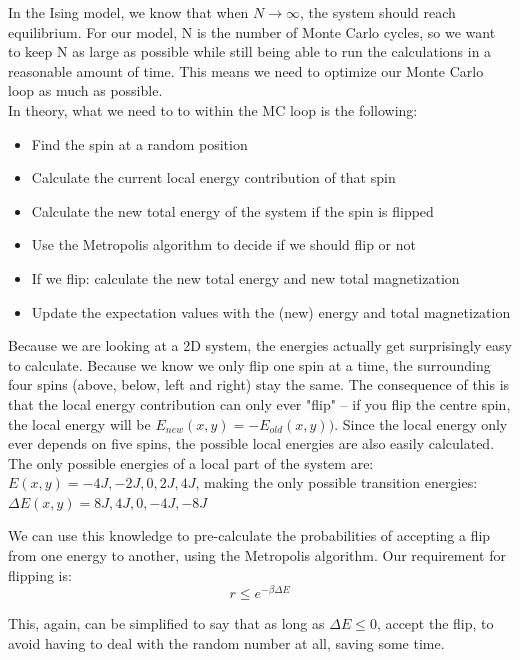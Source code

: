 \documentclass{article}
\begin{document}
		In the Ising model, we know that when $N \rightarrow \infty$, the system should reach equilibrium. For our model, N is the number of Monte Carlo cycles, so we want to keep N as large as possible while still being able to run the calculations in a reasonable amount of time. This means we need to optimize our Monte Carlo loop as much as possible.\\

		In theory, what we need to to within the MC loop is the following:
		\begin{itemize}
			\item Find the spin at a random position
			\item Calculate the current local energy contribution of that spin
			\item Calculate the new total energy of the system if the spin is flipped
			\item Use the Metropolis algorithm to decide if we should flip or not
			\item If we flip: calculate the new total energy and new total magnetization
			\item Update the expectation values with the (new) energy and total magnetization
		\end{itemize}

		Because we are looking at a 2D system, the energies actually get surprisingly easy to calculate. Because we know we only flip one spin at a time, the surrounding four spins (above, below, left and right) stay the same. The consequence of this is that the local energy contribution can only ever "flip" – if you flip the centre spin, the local energy will be $E_{new}(x,y) = -E_{old}(x,y))$. Since the local energy only ever depends on five spins, the possible local energies are also easily calculated. The only possible energies of a local part of the system are: $E(x,y) = {-4J, -2J, 0, 2J, 4J}$, making the only possible transition energies: $\Delta E(x,y) = {8J, 4J, 0, -4J, -8J}$

		We can use this knowledge to pre-calculate the probabilities of accepting a flip from one energy to another, using the Metropolis algorithm. Our requirement for flipping is:
		\begin{equation}
			r \leq e^{-\beta \Delta E}
		\end{equation}

		This, again, can be simplified to say that as long as $\Delta E \leq 0$, accept the flip, to avoid having to deal with the random number at all, saving some time.
\end{document}
